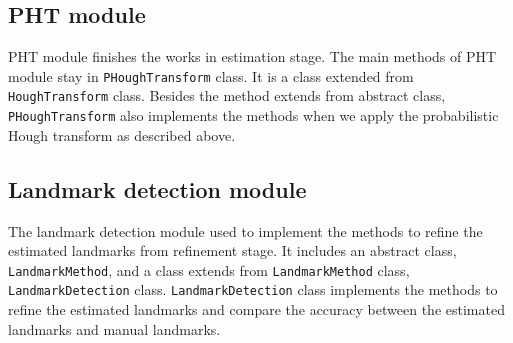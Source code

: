 \subsection{PHT module}
PHT module finishes the works in estimation stage. The main methods of PHT module stay in \texttt{PHoughTransform} class. It is a class extended from \texttt{HoughTransform} class. Besides the method extends from abstract class, \texttt{PHoughTransform} also implements the methods when we apply the probabilistic Hough transform as described above.
\subsection{Landmark detection module}
The landmark detection module used to implement the methods to refine the estimated landmarks from refinement stage. It includes an abstract class, \texttt{LandmarkMethod}, and a class extends from \texttt{LandmarkMethod} class, \texttt{LandmarkDetection} class. \texttt{LandmarkDetection} class implements the methods to refine the estimated landmarks and compare the accuracy between the estimated landmarks and manual landmarks.
